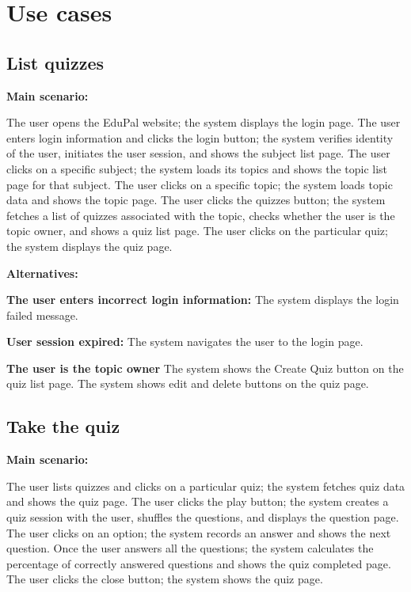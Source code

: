 \documentclass[
    english, %
]{VUMIFPSkursinis}
\begin{document}
\section{Use cases}

\subsection{List quizzes}

\noindent\textbf{\fontsize{13}{15}\selectfont Main scenario:}

The user opens the EduPal website; the system displays the login page. The user enters login information and clicks the login button; the system verifies identity of the user, initiates the user session, and shows the subject list page. The user clicks on a specific subject; the system loads its topics and shows the topic list page for that subject. The user clicks on a specific topic; the system loads topic data and shows the topic page. The user clicks the quizzes button; the system fetches a list of quizzes associated with the topic, checks whether the user is the topic owner, and shows a quiz list page. The user clicks on the particular quiz; the system displays the quiz page.

\noindent\textbf{\fontsize{13}{15}\selectfont Alternatives:}

\textbf{The user enters incorrect login information:} The system displays the login failed message.

\textbf{User session expired:} The system navigates the user to the login page.

\textbf{The user is the topic owner} The system shows the Create Quiz button on the quiz list page. The system shows edit and delete buttons on the quiz page.

\subsection{Take the quiz}

\noindent\textbf{\fontsize{13}{15}\selectfont Main scenario:}

The user lists quizzes and clicks on a particular quiz; the system fetches quiz data and shows the quiz page. The user clicks the play button; the system creates a quiz session with the user, shuffles the questions, and displays the question page. The user clicks on an option; the system records an answer and shows the next question. Once the user answers all the questions; the system calculates the percentage of correctly answered questions and shows the quiz completed page. The user clicks the close button; the system shows the quiz page.
\end{document}
